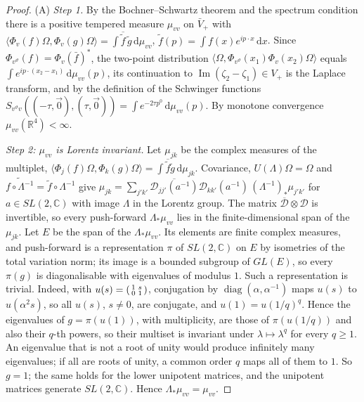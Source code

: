 \documentclass[11pt,a4paper]{amsart}
\theoremstyle{definition}
\theoremstyle{remark}
\numberwithin{equation}{section}
\newcommand{\R}{\mathbb{R}}          %
\newcommand{\C}{\mathbb{C}}          %
\newcommand{\ip}[2]{\langle #1,#2\rangle}  %
\newcommand{\dd}{\,\mathrm{d}}             %
\begin{document}
\begin{proof}
(A) \emph{Step 1.} By the Bochner--Schwartz theorem and the spectrum condition there is a positive tempered measure $\mu_{vv}$ on $\bar V_+$ with $\ip{\Phi_v(f)\Omega}{\Phi_v(g)\Omega}=\int\overline{\tilde f}\,\tilde g\dd\mu_{vv}$, $\tilde f(p)=\int f(x)e^{ip\cdot x}\dd x$. Since $\Phi_{v^\vartheta}(f)=\Phi_v(\bar f)^*$, the two-point distribution $\ip{\Omega}{\Phi_{v^\vartheta}(x_1)\Phi_v(x_2)\Omega}$ equals $\int e^{ip\cdot(x_2-x_1)}\dd\mu_{vv}(p)$, its continuation to $\operatorname{Im}(\zeta_2-\zeta_1)\in V_+$ is the Laplace transform, and by the definition of the Schwinger functions $S_{v^\vartheta v}((-\tau,\vec0),(\tau,\vec0))=\int e^{-2\tau p^0}\dd\mu_{vv}(p)$. By monotone convergence $\mu_{vv}(\R^4)<\infty$.

\emph{Step 2: $\mu_{vv}$ is Lorentz invariant.} Let $\mu_{jk}$ be the complex measures of the multiplet, $\ip{\Phi_j(f)\Omega}{\Phi_k(g)\Omega}=\int\overline{\tilde f}\tilde g\dd\mu_{jk}$. Covariance, $U(\Lambda)\Omega=\Omega$ and $\widetilde{f\circ\Lambda^{-1}}=\tilde f\circ\Lambda^{-1}$ give $\mu_{jk}=\sum_{j'k'}\overline{\mathcal D_{jj'}(a^{-1})}\mathcal D_{kk'}(a^{-1})\,(\Lambda^{-1})_*\mu_{j'k'}$ for $a\in SL(2,\C)$ with image $\Lambda$ in the Lorentz group. The matrix $\overline{\mathcal D}\otimes\mathcal D$ is invertible, so every push-forward $\Lambda_*\mu_{vv}$ lies in the finite-dimensional span of the $\mu_{jk}$. Let $E$ be the span of the $\Lambda_*\mu_{vv}$. Its elements are finite complex measures, and push-forward is a representation $\pi$ of $SL(2,\C)$ on $E$ by isometries of the total variation norm; its image is a bounded subgroup of $GL(E)$, so every $\pi(g)$ is diagonalisable with eigenvalues of modulus $1$. Such a representation is trivial. Indeed, with $u(s)=\begin{psmallmatrix}1&s\\0&1\end{psmallmatrix}$, conjugation by $\operatorname{diag}(\alpha,\alpha^{-1})$ maps $u(s)$ to $u(\alpha^2s)$, so all $u(s)$, $s\ne0$, are conjugate, and $u(1)=u(1/q)^q$. Hence the eigenvalues of $g=\pi(u(1))$, with multiplicity, are those of $\pi(u(1/q))$ and also their $q$-th powers, so their multiset is invariant under $\lambda\mapsto\lambda^q$ for every $q\ge1$. An eigenvalue that is not a root of unity would produce infinitely many eigenvalues; if all are roots of unity, a common order $q$ maps all of them to $1$. So $g=1$; the same holds for the lower unipotent matrices, and the unipotent matrices generate $SL(2,\C)$. Hence $\Lambda_*\mu_{vv}=\mu_{vv}$.


\end{proof}
\end{document}
